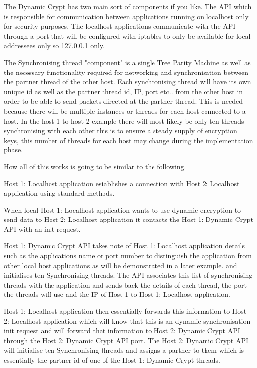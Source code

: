 The Dynamic Crypt has two main sort of components if you like. The API which is responsible for communication between applications running on localhost only for security purposes. The localhost applications communicate with the API through a port that will be configured with iptables to only be available for local addressees only so 127.0.0.1 only. 

The Synchronising thread "component" is a single Tree Parity Machine as well as the necessary functionality required for networking and synchronisation between the partner thread of the other host. Each synchronising thread will have its own unique id as well as the partner thread id, IP, port etc.. from the other host in order to be able to send packets directed at the partner thread. This is needed because there will be multiple instances or threads for each host connected to a host. In the host 1 to host 2 example there will most likely be only ten threads synchronising with each other this is to ensure a steady supply of encryption keys, this number of threads for each host may change during the implementation phase. 

How all of this works is going to be similar to the following. 

Host 1: Localhost application establishes a connection with Host 2: Localhost application using standard methods. 

When local Host 1: Localhost application wants to use dynamic encryption to send data to Host 2: Localhost application it contacts the Host 1: Dynamic Crypt API with an init request. 

Host 1: Dynamic Crypt API takes note of Host 1: Localhost application details such as the applications name or port number to distinguish the application from other local host applications as will be demonstrated in a later example. and initialises ten Synchronising threads. The API associates this list of synchronising threads with the application and sends back the details of each thread, the port the threads will use and the IP of Host 1 to Host 1: Localhost application.

Host 1: Localhost application then essentially forwards this information to Host 2: Localhost application which will know that this is an dynamic synchronisation init request and will forward that information to Host 2: Dynamic Crypt API through the Host 2: Dynamic Crypt API port. The Host 2: Dynamic Crypt API will initialise ten Synchronising threads and assigns a partner to them which is essentially the partner id of one of the Host 1: Dynamic Crypt threads.

